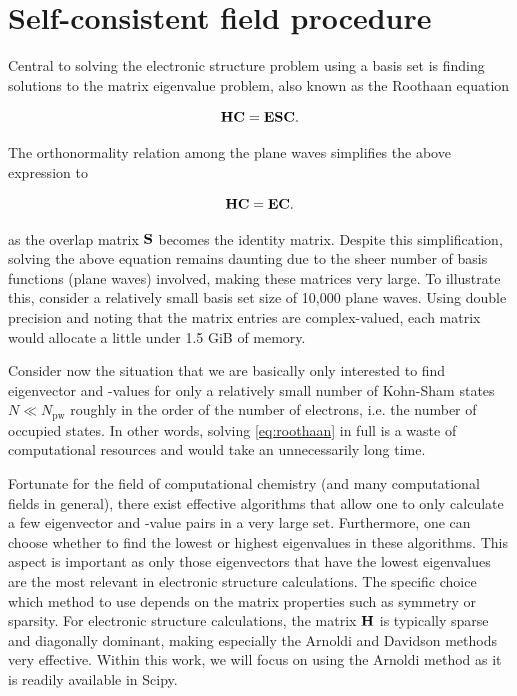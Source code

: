 %
%
%
\section{Self-consistent field procedure}

Central to solving the electronic structure problem using a basis set is finding solutions to the matrix eigenvalue problem, also known as the Roothaan equation

\begin{equation}
    \mathbf{H}\mathbf{C} = \mathbf{E}\mathbf{S}\mathbf{C}.
\end{equation}

The orthonormality relation among the plane waves simplifies the above expression to

\begin{equation}
    \mathbf{H}\mathbf{C} = \mathbf{E}\mathbf{C}.
    \label{eq:roothaan}
\end{equation}

as the overlap matrix $\mathbf{S}$ becomes the identity matrix. Despite this simplification, solving the above equation remains daunting due to the sheer number of basis functions (plane waves) involved, making these matrices very large. To illustrate this, consider a relatively small basis set size of 10,000 plane waves. Using double precision and noting that the matrix entries are complex-valued, each matrix would allocate a little under 1.5 GiB of memory.

Consider now the situation that we are basically only interested to find eigenvector and -values for only a relatively small number of Kohn-Sham states $N \ll N_{\textrm{pw}}$ roughly in the order of the number of electrons, i.e. the number of occupied states. In other words, solving \cref{eq:roothaan} in full is a waste of computational resources and would take an unnecessarily long time.

Fortunate for the field of computational chemistry (and many computational fields in general), there exist effective algorithms that allow one to only calculate a few eigenvector and -value pairs in a very large set. Furthermore, one can choose whether to find the lowest or highest eigenvalues in these algorithms. This aspect is important as only those eigenvectors that have the lowest eigenvalues are the most relevant in electronic structure calculations. The specific choice which method to use depends on the matrix properties such as symmetry or sparsity. For electronic structure calculations, the matrix $\mathbf{H}$ is typically sparse and diagonally dominant, making especially the Arnoldi\cite{1951:arnoldi} and Davidson\cite{1975:davidson} methods very effective. Within this work, we will focus on using the Arnoldi method as it is readily available in Scipy.\cite{arnoldi_scipy}

